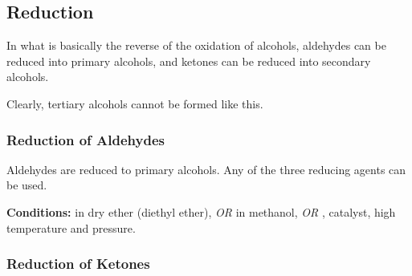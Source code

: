 


		\pagebreak
		\subsection{Reduction}

			In what is basically the reverse of the oxidation of alcohols, aldehydes can be reduced into primary alcohols, and
			ketones can be reduced into secondary alcohols.

			Clearly, tertiary alcohols cannot be formed like this.

			\subsubsection{Reduction of Aldehydes}

				Aldehydes are reduced to primary alcohols. Any of the three reducing agents can be used.

				\vspace{1.5em}
				\vbox{\textbf{Conditions:}	\tabto{35mm} in dry ether (diethyl ether), \textit{OR}
	  										\tabto{35mm}\ch{NaBH4} in methanol, \textit{OR}
	  										\tabto{35mm},  catalyst, high temperature and pressure.}



			\subsubsection{Reduction of Ketones}

